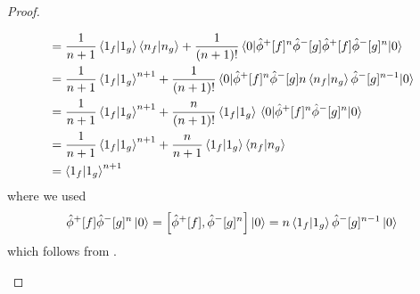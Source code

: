 \begin{proof}
\begin{itemize}
\begin{equation*}
\begin{split}
				&=
				\frac{1}{n+1}
				\braket{1_f}{1_g}
				\braket{n_f}{n_g}
				+
				\frac{1}{(n+1)!}
				\expval{
					\hat\phi^+[f]^n
					\hat\phi^-[g]
					\hat\phi^+[f]
					\hat\phi^-[g]^n
				}{0}
				\\
				&=
				\frac{1}{n+1}
				\braket{1_f}{1_g}^{n+1}
				+
				\frac{1}{(n+1)!}
				\expval{
					\hat\phi^+[f]^n
					\hat\phi^-[g]
					n
					\braket{n_f}{n_g}
					\hat\phi^-[g]^{n-1}
				}{0}
				\\
				&=
				\frac{1}{n+1}
				\braket{1_f}{1_g}^{n+1}
				+
				\frac{n}{(n+1)!}
				\braket{1_f}{1_g}
				\expval{
					\hat\phi^+[f]^n
					\hat\phi^-[g]^n
				}{0}
				\\
				&=
				\frac{1}{n+1}
				\braket{1_f}{1_g}^{n+1}
				+
				\frac{n}{n+1}
				\braket{1_f}{1_g}
				\braket{n_f}{n_g}
				\\
				&=
				\braket{1_f}{1_g}^{n+1}
			\end{split}
		\end{equation*}
		where we used
		\begin{equation*}
			\hat\phi^+[f]
			\hat\phi^-[g]^n
			\ket{0}
			=
			\comm{\hat\phi^+[f]}{\hat\phi^-[g]^n}
			\ket{0}
			=
			n
			\braket{1_f}{1_g}
			\hat\phi^-[g]^{n-1}
			\ket{0}
		\end{equation*}
		which follows from .
	\end{itemize}
\end{proof}

